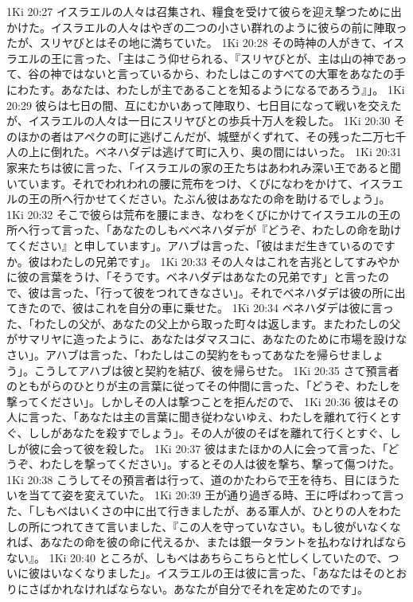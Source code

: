 1Ki 20:27  イスラエルの人々は召集され、糧食を受けて彼らを迎え撃つために出かけた。イスラエルの人々はやぎの二つの小さい群れのように彼らの前に陣取ったが、スリヤびとはその地に満ちていた。
1Ki 20:28  その時神の人がきて、イスラエルの王に言った、「主はこう仰せられる、『スリヤびとが、主は山の神であって、谷の神ではないと言っているから、わたしはこのすべての大軍をあなたの手にわたす。あなたは、わたしが主であることを知るようになるであろう』」。
1Ki 20:29  彼らは七日の間、互にむかいあって陣取り、七日目になって戦いを交えたが、イスラエルの人々は一日にスリヤびとの歩兵十万人を殺した。
1Ki 20:30  そのほかの者はアペクの町に逃げこんだが、城壁がくずれて、その残った二万七千人の上に倒れた。ベネハダデは逃げて町に入り、奥の間にはいった。
1Ki 20:31  家来たちは彼に言った、「イスラエルの家の王たちはあわれみ深い王であると聞いています。それでわれわれの腰に荒布をつけ、くびになわをかけて、イスラエルの王の所へ行かせてください。たぶん彼はあなたの命を助けるでしょう」。
1Ki 20:32  そこで彼らは荒布を腰にまき、なわをくびにかけてイスラエルの王の所へ行って言った、「あなたのしもべベネハダデが『どうぞ、わたしの命を助けてください』と申しています」。アハブは言った、「彼はまだ生きているのですか。彼はわたしの兄弟です」。
1Ki 20:33  その人々はこれを吉兆としてすみやかに彼の言葉をうけ、「そうです。ベネハダデはあなたの兄弟です」と言ったので、彼は言った、「行って彼をつれてきなさい」。それでベネハダデは彼の所に出てきたので、彼はこれを自分の車に乗せた。
1Ki 20:34  ベネハダデは彼に言った、「わたしの父が、あなたの父上から取った町々は返します。またわたしの父がサマリヤに造ったように、あなたはダマスコに、あなたのために市場を設けなさい」。アハブは言った、「わたしはこの契約をもってあなたを帰らせましょう」。こうしてアハブは彼と契約を結び、彼を帰らせた。
1Ki 20:35  さて預言者のともがらのひとりが主の言葉に従ってその仲間に言った、「どうぞ、わたしを撃ってください」。しかしその人は撃つことを拒んだので、
1Ki 20:36  彼はその人に言った、「あなたは主の言葉に聞き従わないゆえ、わたしを離れて行くとすぐ、ししがあなたを殺すでしょう」。その人が彼のそばを離れて行くとすぐ、ししが彼に会って彼を殺した。
1Ki 20:37  彼はまたほかの人に会って言った、「どうぞ、わたしを撃ってください」。するとその人は彼を撃ち、撃って傷つけた。
1Ki 20:38  こうしてその預言者は行って、道のかたわらで王を待ち、目にほうたいを当てて姿を変えていた。
1Ki 20:39  王が通り過ぎる時、王に呼ばわって言った、「しもべはいくさの中に出て行きましたが、ある軍人が、ひとりの人をわたしの所につれてきて言いました、『この人を守っていなさい。もし彼がいなくなれば、あなたの命を彼の命に代えるか、または銀一タラントを払わなければならない』。
1Ki 20:40  ところが、しもべはあちらこちらと忙しくしていたので、ついに彼はいなくなりました」。イスラエルの王は彼に言った、「あなたはそのとおりにさばかれなければならない。あなたが自分でそれを定めたのです」。
